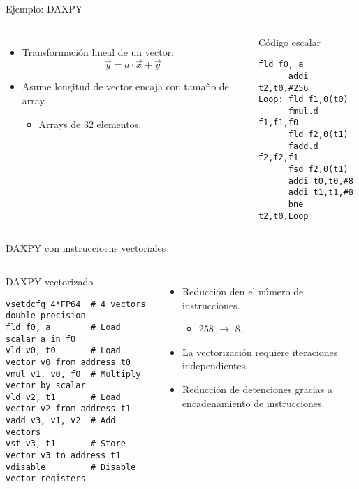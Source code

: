 \begin{frame}[t,fragile]{Ejemplo: DAXPY}
\begin{columns}[T]

\begin{itemize}
  \item Transformación lineal de un vector:
\[
\vec{y} = a \cdot \vec{x} + \vec{y}
\]

  \item Asume longitud de vector encaja con tamaño de array.
    \begin{itemize}
      \item Arrays de 32 elementos.
    \end{itemize}
\end{itemize}

\pause
{}
\begin{block}{Código escalar}
\begin{lstlisting}[language=generalasm2]
      fld f0, a
      addi t2,t0,#256
Loop: fld f1,0(t0)
      fmul.d f1,f1,f0
      fld f2,0(t1)
      fadd.d f2,f2,f1
      fsd f2,0(t1)
      addi t0,t0,#8
      addi t1,t1,#8
      bne t2,t0,Loop
\end{lstlisting}
\end{block}

\end{columns}
\end{frame}

\begin{frame}[t,fragile]{DAXPY con instruccioens vectoriales}
\begin{columns}[T]

\begin{block}{DAXPY vectorizado}
\begin{lstlisting}[language=generalasm2]
vsetdcfg 4*FP64  # 4 vectors double precision
fld f0, a        # Load scalar a in f0
vld v0, t0       # Load vector v0 from address t0
vmul v1, v0, f0  # Multiply vector by scalar
vld v2, t1       # Load vector v2 from address t1
vadd v3, v1, v2  # Add vectors
vst v3, t1       # Store vector v3 to address t1
vdisable         # Disable vector registers
\end{lstlisting}
\end{block}

\begin{itemize}
  \item Reducción den el número de instrucciones.
    \begin{itemize}
      \item 258 $\rightarrow$ 8.
    \end{itemize}

  \item La vectorización requiere iteraciones independientes.

  \item Reducción de detenciones gracias a encadenamiento de instrucciones.
\end{itemize}

\end{columns}
\end{frame}
